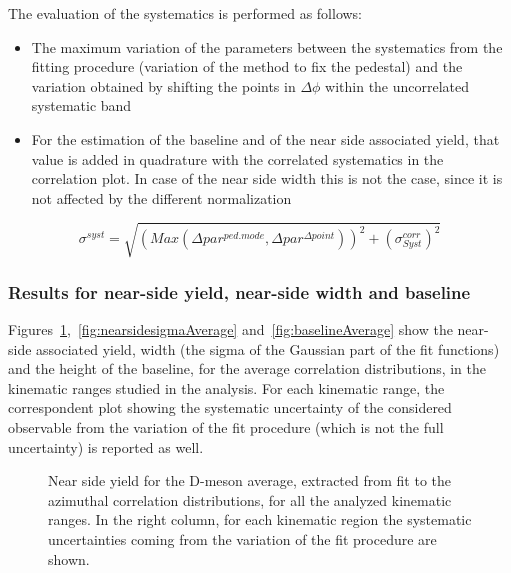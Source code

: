The evaluation of the systematics is performed as follows:

\begin{itemize}
\item The maximum variation of the parameters between the systematics from the fitting procedure (variation of the method to fix the pedestal) and the variation obtained by shifting the points in $\Delta\phi$ within the uncorrelated systematic band
\item For the estimation of the baseline and of the near side associated yield, that value is added in quadrature with the correlated systematics in the correlation plot. In case of the near side width this is not the case, since it is not affected by the different normalization
\end{itemize}

\begin{equation}
\sigma^{syst} = \sqrt{\left(Max\left(\Delta par^{ped.mode},\Delta par^{\Delta point}\right)\right)^{2} + (\sigma_{Syst}^{corr})^{2}}
\end{equation}

\subsubsection{Results for near-side yield, near-side width and baseline}

Figures~\ref{fig:nearsideyieldAverage},~\ref{fig:nearsidesigmaAverage} and~\ref{fig:baselineAverage} show the near-side associated yield, width (the sigma of the Gaussian part of the fit functions) and the height of the baseline, for the average correlation distributions, in the kinematic ranges studied in the analysis. For each kinematic range, the correspondent plot showing the systematic uncertainty of the considered observable from the variation of the fit procedure (which is not the full uncertainty) is reported as well.

\begin{figure}
\centering

\caption{Near side yield for the D-meson average, extracted from fit to the azimuthal correlation distributions, for all the analyzed kinematic ranges. In the right column, for each kinematic region the systematic uncertainties coming from the variation of the fit procedure are shown.}
\label{fig:nearsideyieldAverage}
\end{figure}

